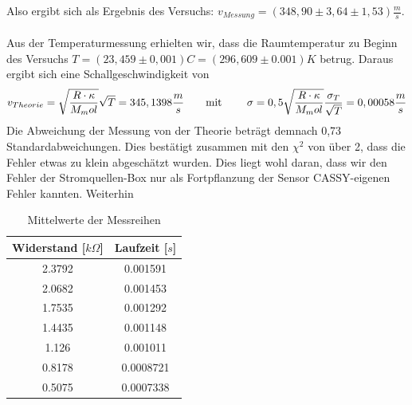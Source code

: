 \documentclass[a4paper]{article}
\begin{document}
	Also ergibt sich als Ergebnis des Versuchs: $v_{Messung} = (348,90 \pm 3,64 \pm 1,53) \frac{m}{s}$. \\\\
	Aus der Temperaturmessung erhielten wir, dass die Raumtemperatur zu Beginn des Versuchs $T = (23,459 \pm 0,001)C = (296,609 \pm 0.001)K$ betrug.
	Daraus ergibt sich eine Schallgeschwindigkeit von
	\begin{equation}
	v_{Theorie} =\sqrt{\frac{R\cdot\kappa}{M_mol}}\sqrt{T} = 345,1398 \frac{m}{s} \text{\qquad mit \qquad}
	\sigma = 0,5 \sqrt{\frac{R\cdot\kappa}{M_mol}} \frac{\sigma_T}{\sqrt{T}} = 0,00058 \frac{m}{s}
	\end{equation}
	Die Abweichung der Messung von der Theorie beträgt demnach 0,73 Standardabweichungen. Dies bestätigt zusammen mit den $\chi^2$ von über 2, dass die Fehler etwas zu klein abgeschätzt wurden. Dies liegt wohl daran, dass wir den Fehler der Stromquellen-Box nur als Fortpflanzung der Sensor CASSY-eigenen Fehler kannten. Weiterhin
	\begin{table}
		\begin{center}
			\begin{tabular}{|c|c|}
				\hline
				\textbf{Widerstand [$k\Omega$]} & \textbf{Laufzeit [$s$]} \\
				\hline
				2.3792 & 0.001591 \\
				\hline
				2.0682 & 0.001453 \\
				\hline
				1.7535 & 0.001292 \\
				\hline
				1.4435 & 0.001148 \\
				\hline
				1.126 & 0.001011 \\
				\hline
				0.8178 & 0.0008721 \\
				\hline
				0.5075 &  0.0007338 \\
				\hline
			\end{tabular}
		\end{center}
		\caption{Mittelwerte der Messreihen}
	\end{table}
	
\end{document}
